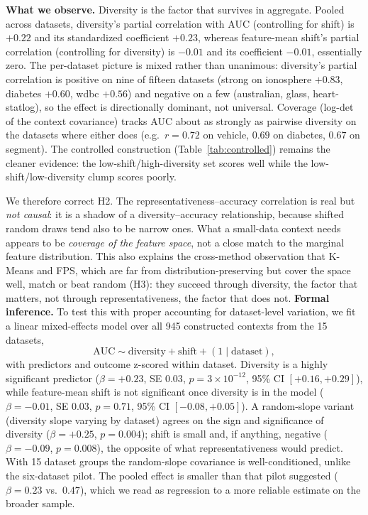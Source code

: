 \documentclass[11pt,a4paper]{article}
\begin{document}
\textbf{What we observe.} Diversity is the factor that survives in aggregate.
Pooled across datasets, diversity's partial correlation with AUC (controlling for
shift) is $+0.22$ and its standardized coefficient $+0.23$, whereas feature-mean
shift's partial correlation (controlling for diversity) is $-0.01$ and its
coefficient $-0.01$, essentially zero. The per-dataset picture is mixed rather
than unanimous: diversity's partial correlation is positive on nine of fifteen
datasets (strong on ionosphere $+0.83$, diabetes $+0.60$, wdbc $+0.56$) and
negative on a few (australian, glass, heart-statlog), so the effect is
directionally dominant, not universal. Coverage (log-det of the context
covariance) tracks AUC about as strongly as pairwise diversity on the datasets
where either does (e.g.\ $r=0.72$ on vehicle, $0.69$ on diabetes, $0.67$ on
segment). The controlled construction (Table~\ref{tab:controlled}) remains the
cleaner evidence: the low-shift/high-diversity set scores well while the
low-shift/low-diversity clump scores poorly.

We therefore correct H2. The representativeness--accuracy correlation is real but
\emph{not causal}: it is a shadow of a diversity--accuracy relationship, because
shifted random draws tend also to be narrow ones. What a small-data context needs
appears to be \emph{coverage of the feature space}, not a close match to the
marginal feature distribution. This also explains the cross-method observation
that K-Means and FPS, which are far from distribution-preserving but cover the
space well, match or beat random (H3): they succeed through diversity, the factor
that matters, not through representativeness, the factor that does not. \textbf{Formal inference.} To test this with proper accounting for dataset-level
variation, we fit a linear mixed-effects model \cite{bates2015lme4} over all 945
constructed contexts from the 15 datasets,
\[
\text{AUC} \sim \text{diversity} + \text{shift} + (1\mid\text{dataset}),
\]
with predictors and outcome z-scored within dataset. Diversity is a highly
significant predictor ($\beta=+0.23$, SE $0.03$, $p=3\times10^{-12}$, 95\% CI
$[+0.16,+0.29]$), while feature-mean shift is not significant once diversity is
in the model ($\beta=-0.01$, SE $0.03$, $p=0.71$, 95\% CI $[-0.08,+0.05]$). A
random-slope variant (diversity slope varying by dataset) agrees on the sign and
significance of diversity ($\beta=+0.25$, $p=0.004$); shift is small and, if
anything, negative ($\beta=-0.09$, $p=0.008$), the opposite of what
representativeness would predict. With 15 dataset groups the random-slope
covariance is well-conditioned, unlike the six-dataset pilot. The pooled effect
is smaller than that pilot suggested ($\beta=0.23$ vs.\ $0.47$), which we read as
regression to a more reliable estimate on the broader sample.
\end{document}

